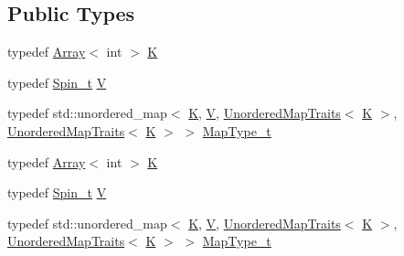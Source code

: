 \subsection*{Public Types}
\begin{DoxyCompactItemize}
\item 
typedef \mbox{\hyperlink{classXMLArray_1_1Array}{Array}}$<$ int $>$ \mbox{\hyperlink{classHadron_1_1HadronDistOperatorRep__t_a670c7409bfd80616aeb0159590bcdb6b}{K}}
\item 
typedef \mbox{\hyperlink{structHadron_1_1HadronDistOperatorRep__t_1_1Spin__t}{Spin\+\_\+t}} \mbox{\hyperlink{classHadron_1_1HadronDistOperatorRep__t_a40f37383ae57b1d0bbf944d698a10382}{V}}
\item 
typedef std\+::unordered\+\_\+map$<$ \mbox{\hyperlink{classHadron_1_1HadronDistOperatorRep__t_a670c7409bfd80616aeb0159590bcdb6b}{K}}, \mbox{\hyperlink{classHadron_1_1HadronDistOperatorRep__t_a40f37383ae57b1d0bbf944d698a10382}{V}}, \mbox{\hyperlink{structADAT_1_1UnorderedMapTraits}{Unordered\+Map\+Traits}}$<$ \mbox{\hyperlink{classHadron_1_1HadronDistOperatorRep__t_a670c7409bfd80616aeb0159590bcdb6b}{K}} $>$, \mbox{\hyperlink{structADAT_1_1UnorderedMapTraits}{Unordered\+Map\+Traits}}$<$ \mbox{\hyperlink{classHadron_1_1HadronDistOperatorRep__t_a670c7409bfd80616aeb0159590bcdb6b}{K}} $>$ $>$ \mbox{\hyperlink{classHadron_1_1HadronDistOperatorRep__t_a28874b1705be0d32099d426de9fb44c0}{Map\+Type\+\_\+t}}
\item 
typedef \mbox{\hyperlink{classXMLArray_1_1Array}{Array}}$<$ int $>$ \mbox{\hyperlink{classHadron_1_1HadronDistOperatorRep__t_a670c7409bfd80616aeb0159590bcdb6b}{K}}
\item 
typedef \mbox{\hyperlink{structHadron_1_1HadronDistOperatorRep__t_1_1Spin__t}{Spin\+\_\+t}} \mbox{\hyperlink{classHadron_1_1HadronDistOperatorRep__t_a40f37383ae57b1d0bbf944d698a10382}{V}}
\item 
typedef std\+::unordered\+\_\+map$<$ \mbox{\hyperlink{classHadron_1_1HadronDistOperatorRep__t_a670c7409bfd80616aeb0159590bcdb6b}{K}}, \mbox{\hyperlink{classHadron_1_1HadronDistOperatorRep__t_a40f37383ae57b1d0bbf944d698a10382}{V}}, \mbox{\hyperlink{structADAT_1_1UnorderedMapTraits}{Unordered\+Map\+Traits}}$<$ \mbox{\hyperlink{classHadron_1_1HadronDistOperatorRep__t_a670c7409bfd80616aeb0159590bcdb6b}{K}} $>$, \mbox{\hyperlink{structADAT_1_1UnorderedMapTraits}{Unordered\+Map\+Traits}}$<$ \mbox{\hyperlink{classHadron_1_1HadronDistOperatorRep__t_a670c7409bfd80616aeb0159590bcdb6b}{K}} $>$ $>$ \mbox{\hyperlink{classHadron_1_1HadronDistOperatorRep__t_a28874b1705be0d32099d426de9fb44c0}{Map\+Type\+\_\+t}}
\end{DoxyCompactItemize}
